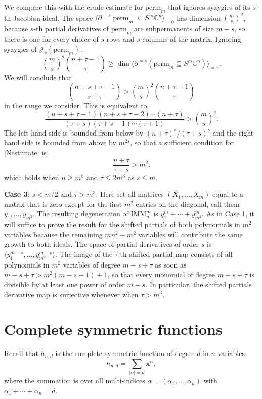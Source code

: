 \documentclass{toc}
\newcommand{\vvirg}{ , \dots , }
\newcommand{\bfx}{\mathbf{x}}
\newcommand{\calJ}{\mathcal{J}}
\newcommand{\perm}{\mathrm{perm}}
\def\BC{\mathbb C}
\def\t{\tau}
\def\tperm{\operatorname{perm}}
\newcommand{\IMM}{\mathrm{IMM}}
\begin{document}
We compare this with the crude estimate for $\perm_m$ that ignores syzygies of its $s$-th Jacobian ideal. The space $\langle \partial^{=s} \tperm_m\subseteq S^m\BC^n \rangle_{=0}$ has dimension $\binom{m}{s}^2$, because $s$-th partial derivatives of $\perm_m$ are subpermanents of size $m-s$, so there is one for every choice of $s$ rows and $s$ columns of the matrix. Ignoring syzygies of $\calJ_s(\perm_m)$\,,
$$
{\binom m s}^2\binom{n+\t-1}{\t} \geq \dim  \langle \partial^{=s}(\perm_m\subseteq S^m\BC^n) \rangle_{=\t}.
$$
We will conclude that
\[
  \binom {n+s+\t-1}{s+\t}>{\binom m s}^2\binom{n+\t-1}{\t}
\]
in the range we consider. This is equivalent to
\begin{equation}\label{Nestimate}
\frac{(n+s+\t-1)( n+s+\t-2)\cdots (n+\t)}{(\t+s)(\t+s-1)\cdots (\t+1)}>{\binom ms}^2.
\end{equation}
The left hand side is bounded from below by ${(n+\tau)^s}/{(\tau + s)^s}$ and the right hand side is bounded from above by $m^{2s}$, so that a sufficient condition for \eqref{Nestimate} is 
 \[
  \frac{n+\tau}{\tau+s} > m^2.
 \]
which holds when $n \geq m^5$  and $\tau \leq 2m^3$ as $s \leq m$. 

 
{\bf Case 3}: $s < {m}/{2}$ and $\t>m^3$. Here set all matrices $(X_1 \vvirg X_m)$ equal to a matrix that is  zero except for  the first $m^2$ entries on the diagonal, call them $y_1 \vvirg y_{m^2}$. The resulting degeneration of $\IMM^m_n$  is $y_1^m+\cdots + y_{m^2}^m$. As in Case 1, it will suffice to prove the result for  the shifted partials of both polynomials in $m^2$ variables because the remaining $mn^2-m^2$ variables will contribute the same growth to both  ideals. The space of partial derivatives of order $s$ is $\langle y_1^{m-s} \vvirg y_{m^2}^{m-s}\rangle$. The image of the $\tau$-th shifted partial map consists of all polynomials in $m^2$ variables of degree $m-s+\t$ as soon as $m-s+\t> m^2(m-s-1)+1$, so that every monomial of degree $m-s+\tau$ is divisible by at least one power of order $m-s$. In particular, the shifted partials derivative map is surjective whenever when $\t>m^3$.  


\section{Complete symmetric functions}

 Recall that  $h_{n,d}$ is the complete symmetric function of degree $d$ in $n$ variables:
\[
 h_{n,d} = \sum_{\vert \alpha \vert = d} \bfx^\alpha,
\]
 where the summation is over all multi-indices $\alpha = (\alpha_1 \vvirg \alpha_n)$ with $\alpha_1 + \cdots + \alpha_n = d$.
\end{document}
